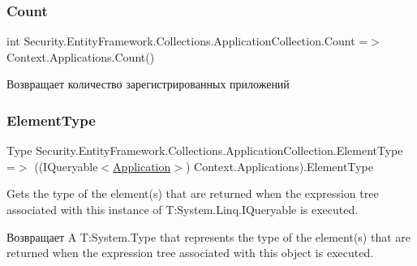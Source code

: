 \subsubsection{\texorpdfstring{Count}{Count}}
{\footnotesize\ttfamily int Security.\+Entity\+Framework.\+Collections.\+Application\+Collection.\+Count =$>$ Context.\+Applications.\+Count()}



Возвращает количество зарегистрированных приложений 

\mbox{\label{class_security_1_1_entity_framework_1_1_collections_1_1_application_collection_a6d57d2a528ece38905825146e3aa076e}} 
\subsubsection{\texorpdfstring{Element\+Type}{ElementType}}
{\footnotesize\ttfamily Type Security.\+Entity\+Framework.\+Collections.\+Application\+Collection.\+Element\+Type =$>$ ((I\+Queryable$<$\hyperlink{class_security_1_1_model_1_1_application}{Application}$>$) Context.\+Applications).Element\+Type}



Gets the type of the element(s) that are returned when the expression tree associated with this instance of T\+:\+System.\+Linq.\+I\+Queryable is executed. 

\begin{DoxyReturn}{Возвращает}
A T\+:\+System.\+Type that represents the type of the element(s) that are returned when the expression tree associated with this object is executed. 
\end{DoxyReturn}
\mbox{\label{class_security_1_1_entity_framework_1_1_collections_1_1_application_collection_a41e255ce668e2507f2ac68ef89ab4a7c}} 
